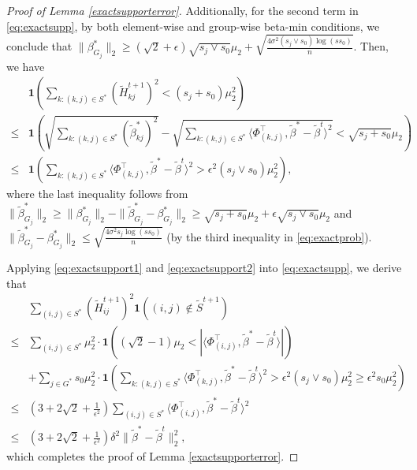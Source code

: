 \documentclass[12pt]{article}
\newtheorem{proof}{Proof}
\begin{document}
\begin{appendix}
\begin{proof}[Proof of Lemma \ref{exactsupporterror}]
Additionally, for the second term in \eqref{eq:exactsupp}, by both element-wise and group-wise beta-min conditions, we conclude that $\| \beta_{G_j}^*\|_2 \ge (\sqrt2 + \epsilon) \sqrt{s_j \vee s_0} \mu_2 + \sqrt{ \frac{4 \sigma^2 (s_j \vee s_0) \log(ss_0)}{n} }$. 
Then, we have 
\begin{equation}\label{eq:exactsupport2}
\begin{aligned}
&\mathbf1\left( \sum_{k: (k,j)\in S^*}\left( \tilde H_{kj}^{t+1}\right)^2 < (s_j+s_0) \mu_2^2 \right) \\
\le & \mathbf1\left(  \sqrt{\sum_{k: (k,j)\in S^*} \left( \tilde \beta_{kj}^* \right)^2 }- \sqrt{\sum_{k: (k,j)\in S^*}\langle{\Phi}_{(k,j)}^\top,\tilde\beta^*-\tilde\beta^{t}\rangle^2} 
< \sqrt{s_j+s_0} \mu_2 \right) \\
\le & \mathbf1\left( \sum_{k: (k,j)\in S^*} \langle{\Phi}_{(k,j)}^\top,\tilde\beta^*-\tilde\beta^{t}\rangle^2 
> \epsilon^2 (s_j \vee s_0) \mu_2^2 \right),
\end{aligned}
\end{equation}
where the last inequality follows from $\| \tilde \beta_{G_j}^* \|_2
\ge \| \beta_{G_j}^* \|_2 - \| \tilde \beta_{G_j}^* - \beta_{G_j}^* \|_2
\ge \sqrt{s_j+s_0} \mu_2 + \epsilon \sqrt{s_j \vee s_0} \mu_2 $ and $\| \tilde \beta_{G_j}^* - \beta_{G_j}^* \|_2 \le \sqrt{\frac{4\sigma^2 s_j \log(ss_0) }{n}}$ (by the third inequality in \eqref{eq:exactprob}). 

Applying \eqref{eq:exactsupport1} and \eqref{eq:exactsupport2} into \eqref{eq:exactsupp}, we derive that 
\begin{align*}
& \sum_{ (i,j) \in S^* } \left( \tilde H_{ij}^{t+1}\right)^2 
  \mathbf1\left( (i,j) \notin \tilde S^{t+1}\right) \\
\le &  \sum_{(i,j) \in S^*} \mu_2^2 \cdot
  \mathbf1\left( (\sqrt2-1 ) \mu_2 < |\langle{\Phi}_{(i,j)}^\top, \tilde\beta^*-\tilde\beta^{t}\rangle| \right)\\ 
  &+ \sum_{j \in G^*} s_0 \mu_2^2 \cdot 
  \mathbf1\left( \sum_{k: (k,j)\in S^*} \langle{\Phi}_{(k,j)}^\top,\tilde\beta^*-\tilde\beta^{t}\rangle^2 
   > \epsilon^2 (s_j \vee s_0) \mu_2^2 \ge \epsilon^2 s_0 \mu_2^2\right)\\
\le &  \left( 3 + 2\sqrt2 +\frac1{\epsilon^2} \right) \sum_{(i,j) \in S^*}  \langle{\Phi}_{(i,j)}^\top, \tilde\beta^*-\tilde\beta^{t}\rangle^2 \\ 
\le &  \left( 3 + 2\sqrt2 +\frac1{\epsilon^2} \right) \delta^2 \|\tilde\beta^*-\tilde\beta^{t}\|_2^2,
\end{align*}
which completes the proof of Lemma \ref{exactsupporterror}.
\end{proof}


\end{appendix}
\end{document}

